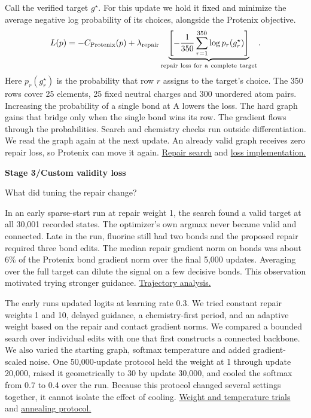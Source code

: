 \documentclass[11pt,a4paper]{article}
\newcommand{\topic}[1]{{\sffamily\bfseries\small\color{guide}#1\par}\vspace{2pt}}
\newcommand{\heading}[1]{{\raggedright\fontsize{25}{28}\selectfont #1\par}\vspace{4pt}}
\newcommand{\subhead}[1]{\par\vspace{4pt}{\sffamily\bfseries\fontsize{12}{14}\selectfont #1\par}\vspace{-2pt}}
\newcommand{\footlink}[2]{\href{#1}{#2}}
\begin{document}
\subhead{How a discrete repair produces a gradient}
Call the verified target $g^\star$. For this update we hold it fixed and minimize the average negative log probability of its choices, alongside the Protenix objective.
\[
  L(p)=-C_{\rm Protenix}(p)+\lambda_{\rm repair}
    \underbrace{\left[-\frac{1}{350}\sum_{r=1}^{350}\log p_r(g^\star_r)\right]}_{\rm repair\ loss\ for\ a\ complete\ target}.
\]
Here $p_r(g^\star_r)$ is the probability that row $r$ assigns to the target's choice. The 350 rows cover 25 elements, 25 fixed neutral charges and 300 unordered atom pairs. Increasing the probability of a single bond at A lowers the loss. The hard graph gains that bridge only when the single bond wins its row. The gradient flows through the probabilities. Search and chemistry checks run outside differentiation. We read the graph again at the next update. An already valid graph receives zero repair loss, so Protenix can move it again. \footlink{https://github.com/NikolajHJ/mosaic/blob/bcef814cdb07ed056a47747f47f458e59d6d97e6/src/mosaic/small_molecule/chemistry/structural.py}{Repair search} and \footlink{https://github.com/NikolajHJ/mosaic/blob/bcef814cdb07ed056a47747f47f458e59d6d97e6/src/mosaic/small_molecule/chemistry/loss.py}{loss implementation.}

\newpage
\topic{Stage 3\enspace/\enspace Custom validity loss}
\heading{What did tuning the repair change?}
In an early sparse-start run at repair weight 1, the search found a valid target at all 30,001 recorded states. The optimizer's own argmax never became valid and connected. Late in the run, fluorine still had two bonds and the proposed repair required three bond edits. The median repair gradient norm on bonds was about 6\% of the Protenix bond gradient norm over the final 5,000 updates. Averaging over the full target can dilute the signal on a few decisive bonds. This observation motivated trying stronger guidance. \footlink{https://github.com/NikolajHJ/mosaic/blob/bcef814cdb07ed056a47747f47f458e59d6d97e6/experiments/brd4-jq1/protenix-random-chem/runs/20261102-results-interpretation-01/README.md}{Trajectory analysis.}

\subhead{Which settings we varied}
The early runs updated logits at learning rate 0.3. We tried constant repair weights 1 and 10, delayed guidance, a chemistry-first period, and an adaptive weight based on the repair and contact gradient norms. We compared a bounded search over individual edits with one that first constructs a connected backbone. We also varied the starting graph, softmax temperature and added gradient-scaled noise. One 50,000-update protocol held the weight at 1 through update 20,000, raised it geometrically to 30 by update 30,000, and cooled the softmax from 0.7 to 0.4 over the run. Because this protocol changed several settings together, it cannot isolate the effect of cooling. \footlink{https://github.com/NikolajHJ/mosaic/blob/bcef814cdb07ed056a47747f47f458e59d6d97e6/experiments/brd4-jq1/protenix-random-chem/runs/20261031-chemistry-strategies-01/README.md}{Weight and temperature trials} and \footlink{https://github.com/NikolajHJ/mosaic/blob/bcef814cdb07ed056a47747f47f458e59d6d97e6/experiments/brd4-jq1/protenix-random-chem/runs/20261103-sparse-annealed-seeds-01/README.md}{annealing protocol.}
\end{document}
